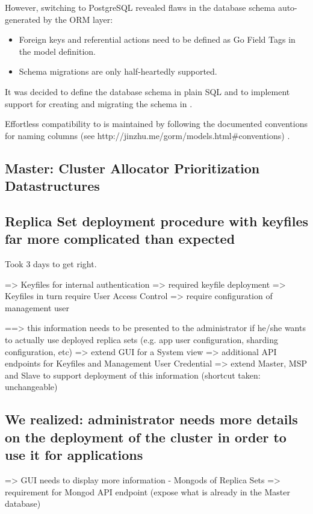 However, switching to PostgreSQL revealed flaws in the database schema auto-generated by the  ORM layer:

\begin{itemize}
\item Foreign keys and referential actions need to be defined as Go Field Tags in the model definition.
\item Schema migrations are only half-heartedly supported.
\end{itemize}

It was decided to define the database schema in plain SQL and to implement support for creating and migrating the schema in \mamid. %

Effortless compatibility to  is maintained by following the documented conventions for naming columns (see http://jinzhu.me/gorm/models.html\#conventions) .

\subsection{Master: Cluster Allocator Prioritization Datastructures}

\subsection{Replica Set deployment procedure with keyfiles far more complicated than expected}

Took 3 days to get right.

=> Keyfiles for internal authentication => required keyfile deployment
=> Keyfiles in turn require User Access Control  => require configuration of management user

==> this information needs to be presented to the administrator if he/she wants to actually use deployed replica sets
    (e.g. app user configuration, sharding configuration, etc)
    => extend GUI for a System view
      => additional API endpoints for Keyfiles and Management User Credential
    => extend Master, MSP and Slave to support deployment of this information
       (shortcut taken: unchangeable)

\subsection{We realized: administrator needs more details on the deployment of the cluster in order to use it for applications}

=> GUI needs to display more information
    - Mongods of Replica Sets
    => requirement for Mongod API endpoint (expose what is already in the Master database)

